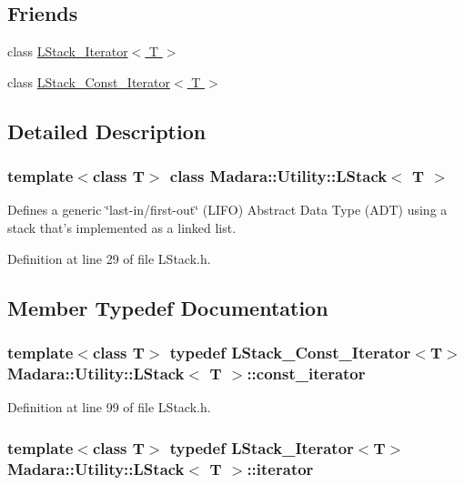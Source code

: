 \subsection*{Friends}
\begin{DoxyCompactItemize}
\item 
class \hyperlink{classMadara_1_1Utility_1_1LStack_afd49fb0e9c9c1eca4995543b40730bd6}{LStack\_\-Iterator$<$ T $>$}
\item 
class \hyperlink{classMadara_1_1Utility_1_1LStack_a89d40a24a48c96d1efbe20a313795474}{LStack\_\-Const\_\-Iterator$<$ T $>$}
\end{DoxyCompactItemize}


\subsection{Detailed Description}
\subsubsection*{template$<$class T$>$ class Madara::Utility::LStack$<$ T $>$}

Defines a generic \char`\"{}last-\/in/first-\/out\char`\"{} (LIFO) Abstract Data Type (ADT) using a stack that's implemented as a linked list. 

Definition at line 29 of file LStack.h.



\subsection{Member Typedef Documentation}
\hypertarget{classMadara_1_1Utility_1_1LStack_a3e179be3d0b6267aa5fb836cbbb6ca8a}{
\subsubsection[{const\_\-iterator}]{\setlength{\rightskip}{0pt plus 5cm}template$<$class T$>$ typedef {\bf LStack\_\-Const\_\-Iterator}$<$T$>$ {\bf Madara::Utility::LStack}$<$ T $>$::{\bf const\_\-iterator}}}
\label{d1/d68/classMadara_1_1Utility_1_1LStack_a3e179be3d0b6267aa5fb836cbbb6ca8a}


Definition at line 99 of file LStack.h.

\hypertarget{classMadara_1_1Utility_1_1LStack_a655fbffe5cfea6579d334bb4ccfc484a}{
\subsubsection[{iterator}]{\setlength{\rightskip}{0pt plus 5cm}template$<$class T$>$ typedef {\bf LStack\_\-Iterator}$<$T$>$ {\bf Madara::Utility::LStack}$<$ T $>$::{\bf iterator}}}
\label{d1/d68/classMadara_1_1Utility_1_1LStack_a655fbffe5cfea6579d334bb4ccfc484a}


